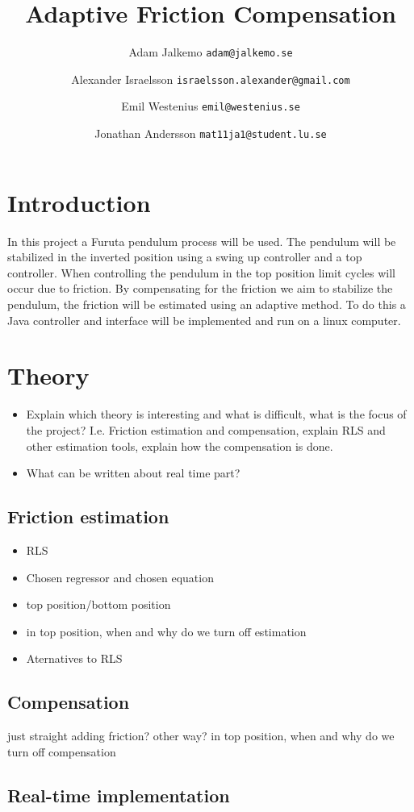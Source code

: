 \documentclass[10pt,a4paper]{article}
\author{Adam Jalkemo \texttt{adam@jalkemo.se} \and
Alexander Israelsson \texttt{israelsson.alexander@gmail.com} \and
Emil Westenius \texttt{emil@westenius.se} \and
Jonathan Andersson \texttt{mat11ja1@student.lu.se}}
\title{Adaptive Friction Compensation}
\begin{document}
\maketitle
\section{Introduction}
In this project a Furuta pendulum process will be used. The pendulum will be stabilized in the inverted position using a swing up controller and a top controller. When controlling the pendulum in the top position limit cycles will occur due to friction. By compensating for the friction we aim to stabilize the pendulum, the friction will be estimated using an adaptive method. To do this a Java controller and interface will be implemented and run on a linux computer.
\section{Theory}
\begin{itemize}
\item Explain which theory is interesting and what is difficult, what is the focus of the project? I.e. Friction estimation and compensation, explain RLS and other estimation tools, explain how the compensation is done. 
\item What can be written about real time part?
\end{itemize}
\subsection{Friction estimation}
\begin{itemize}
\item RLS
\item Chosen regressor and chosen equation
\item top position/bottom position
\item in top position, when and why do we turn off estimation
\item Aternatives to RLS
\end{itemize}
\subsection{Compensation}
just straight adding friction? other way?
in top position, when and why do we turn off compensation
\subsection{Real-time implementation}
\end{document}
